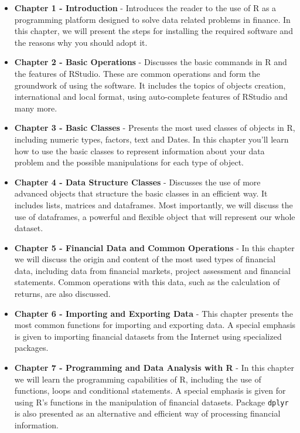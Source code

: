 \documentclass[11pt,]{book}
\begin{document}
\begin{itemize}
\item
  \textbf{Chapter 1 - Introduction} - Introduces the reader to the use
  of R as a programming platform designed to solve data related problems
  in finance. In this chapter, we will present the steps for installing
  the required software and the reasons why you should adopt it.
\item
  \textbf{Chapter 2 - Basic Operations} - Discusses the basic commands
  in R and the features of RStudio. These are common operations and form
  the groundwork of using the software. It includes the topics of
  objects creation, international and local format, using auto-complete
  features of RStudio and many more.
\item
  \textbf{Chapter 3 - Basic Classes} - Presents the most used classes of
  objects in R, including numeric types, factors, text and Dates. In
  this chapter you'll learn how to use the basic classes to represent
  information about your data problem and the possible manipulations for
  each type of object.
\item
  \textbf{Chapter 4 - Data Structure Classes} - Discusses the use of
  more advanced objects that structure the basic classes in an efficient
  way. It includes lists, matrices and dataframes. Most importantly, we
  will discuss the use of dataframes, a powerful and flexible object
  that will represent our whole dataset.
\item
  \textbf{Chapter 5 - Financial Data and Common Operations} - In this
  chapter we will discuss the origin and content of the most used types
  of financial data, including data from financial markets, project
  assessment and financial statements. Common operations with this data,
  such as the calculation of returns, are also discussed.
\item
  \textbf{Chapter 6 - Importing and Exporting Data} - This chapter
  presents the most common functions for importing and exporting data. A
  special emphasis is given to importing financial datasets from the
  Internet using specialized packages.
\item
  \textbf{Chapter 7 - Programming and Data Analysis with R} - In this
  chapter we will learn the programming capabilities of R, including the
  use of functions, loops and conditional statements. A special emphasis
  is given for using R's functions in the manipulation of financial
  datasets. Package \texttt{dplyr} is also presented as an alternative
  and efficient way of processing financial information.

\end{itemize}
\end{document}
